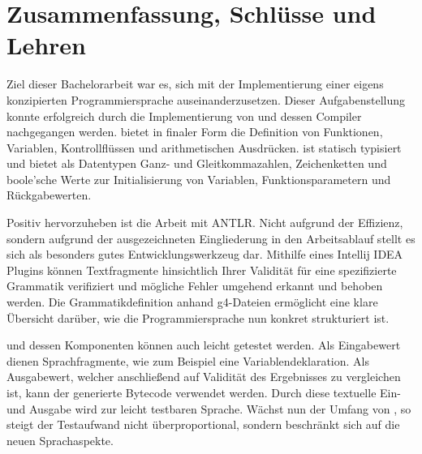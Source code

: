 \chapter{Zusammenfassung, Schlüsse und Lehren}
\label{cha:Schluss}




Ziel dieser Bachelorarbeit war es, sich mit der Implementierung einer eigens konzipierten Programmiersprache auseinanderzusetzen. Dieser Aufgabenstellung konnte erfolgreich durch die Implementierung von \toya und dessen Compiler nachgegangen werden. \Toya bietet in finaler Form die Definition von Funktionen, Variablen, Kontrollflüssen und arithmetischen Ausdrücken. \Toya ist statisch typisiert und bietet als Datentypen Ganz- und Gleitkommazahlen, Zeichenketten und boole'sche Werte zur Initialisierung von Variablen, Funktionsparametern und Rückgabewerten.

Positiv hervorzuheben ist die Arbeit mit ANTLR. Nicht aufgrund der Effizienz, sondern aufgrund der ausgezeichneten Eingliederung in den Arbeitsablauf stellt es sich als besonders gutes Entwicklungswerkzeug dar. Mithilfe eines Intellij IDEA Plugins können Textfragmente hinsichtlich Ihrer Validität für eine spezifizierte Grammatik verifiziert und mögliche Fehler umgehend erkannt und behoben werden. Die Grammatikdefinition anhand g4-Dateien ermöglicht eine klare Übersicht darüber, wie die Programmiersprache nun konkret strukturiert ist.

\Toya und dessen Komponenten können auch leicht getestet werden. Als Eingabewert dienen Sprachfragmente, wie zum Beispiel eine Variablendeklaration. Als Ausgabewert, welcher anschließend auf Validität des Ergebnisses zu vergleichen ist, kann der generierte Bytecode verwendet werden. Durch diese textuelle Ein- und Ausgabe wird \toya zur leicht testbaren Sprache. Wächst nun der Umfang von \toya, so steigt der Testaufwand nicht überproportional, sondern beschränkt sich auf die neuen Sprachaspekte.

